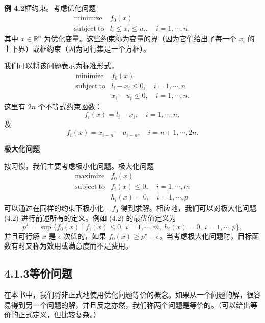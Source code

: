 \documentclass[UTF8, 12pt, fontset=fandol, oneside]{ctexart}
\begin{document}
\noindent\textbf{例 4.2}\quad 框约束。考虑优化问题
\[
\begin{array}{ll}
\mathop{\mathrm{minimize}} & f_0(x)\\
\mathrm{subject\ to} & l_i\leq x_i\leq u_i,\quad i=1,\cdots,n,
\end{array}
\]
其中 $x\in\mathbb{R}^n$ 为优化变量。这些约束称为变量的界（因为它们给出了每一个 $x_i$ 的上下界）或框约束（因为可行集是一个方框）。

我们可以将该问题表示为标准形式，
\[
\begin{array}{ll}
\mathop{\mathrm{minimize}} & f_0(x)\\
\mathrm{subject\ to} & l_i-x_i\leq 0,\quad i=1,\cdots,n\\
& x_i-u_i\leq 0,\quad i=1,\cdots,n.
\end{array}
\]
这里有 $2n$ 个不等式约束函数：
\[
f_i(x)=l_i-x_i,\quad i=1,\cdots,n,
\]
及
\[
f_i(x)=x_{i-n}-u_{i-n},\quad i=n+1,\cdots,2n.
\]

\noindent\textbf{极大化问题}

按习惯，我们主要考虑极小化问题。极大化问题
\begin{equation}
\begin{array}{ll}
\mathop{\mathrm{maximize}} & f_0(x)\\
\mathrm{subject\ to} & f_i(x)\leq 0,\quad i=1,\cdots,m\\
& h_i(x)=0,\quad i=1,\cdots,p
\end{array}
\tag{4.2}
\end{equation}
可以通过在同样的约束下极小化 $-f_0$ 得到求解。相应地，我们可以对极大化问题 (4.2) 进行前述所有的定义。例如 (4.2) 的最优值定义为
\[
p^\star=\sup\{f_0(x)\mid f_i(x)\leq 0,\ i=1,\cdots,m,\ h_i(x)=0,\ i=1,\cdots,p\},
\]
并且可行解 $x$ 是 $\epsilon$-次优的，如果 $f_0(x)\geq p^\star-\epsilon$。当考虑极大化问题时，目标函数有时又称为效用或满意度而不是费用。

\subsection*{4.1.3\quad 等价问题}

在本书中，我们将非正式地使用优化问题等价的概念。如果从一个问题的解，很容易得到另一个问题的解，并且反之亦然，我们称两个问题是等价的。（可以给出等价的正式定义，但比较复杂。）
\end{document}
